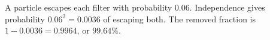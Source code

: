 A particle escapes each filter with probability $0.06$. Independence gives probability $0.06^2=0.0036$ of escaping both. The removed fraction is $1-0.0036=0.9964$, or $\boxed{99.64\%}$.
